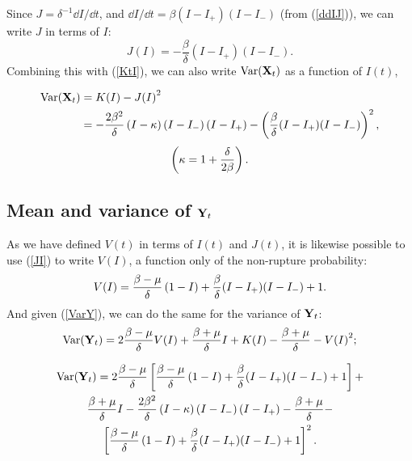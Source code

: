 Since $J = \delta^{-1}{\dd I}/{\dd t} $, and ${\dd I}/{\dd t} =  \beta (I - I_+)(I-I_-)$ (from (\ref{ddIJ})), we can write $J$ in terms of $I$:
\begin{equation}
\label{JI}
J(I) = -\frac{\beta}{\delta}  (I - I_+)(I-I_-).
\end{equation}
Combining this with (\ref{KtI}), we can also write $\text{Var}({{\bf X}_t})$ as a function of $I(t)$,

\begin{align*}
\text{Var}({{\bf X}_t}) &= K(I) - {J(I)}^2\\
&=-\frac{2\beta^2}{\delta}\left( I-\kappa\right)\left( I-I_-\right)\left( I-I_+\right) - \left(\frac{\beta}{\delta}  (I - I_+)(I-I_-)\right)^2,
\end{align*}
$$\left(\kappa = 1+\frac{\delta}{2\beta}\right).$$



\subsection{Mean and variance of ${{\bf Y}_t}$}

As we have defined $V(t)$ in terms of $I(t)$ and $J(t)$, it is likewise possible to use (\ref{JI}) to write $V(I)$, a function only of the non-rupture probability:
$$V(I) = \frac{\beta - \mu}{\delta}\left(1-I\right) + \frac{\beta}{\delta} (I - I_+)(I-I_-) + 1.$$
And given (\ref{VarY}), we can do the same for the variance of ${{\bf Y}_t}$:
$$\text{Var}({{\bf Y}_t}) = 2\frac{\beta-\mu}{\delta} V(I) + \frac{\beta+\mu}{\delta}I + K(I) - \frac{\beta+\mu}{\delta} - {V(I)}^2;$$


\begin{multline*}
\text{Var}({{\bf Y}_t}) = 2\frac{\beta - \mu}{\delta} \left[ \frac{\beta - \mu}{\delta}\left(1-I\right) + \frac{\beta}{\delta} (I - I_+)(I-I_-) + 1\right] + \\
\frac{\beta+\mu}{\delta} I -\frac{2\beta^2}{\delta}\left( I-\kappa\right)\left( I-I_-\right)\left( I-I_+\right) - \frac{\beta + \mu}{\delta} - \\ \left[\frac{\beta - \mu}{\delta}\left(1-I\right) + \frac{\beta}{\delta} (I - I_+)(I-I_-) + 1\right]^2.
\end{multline*}




































